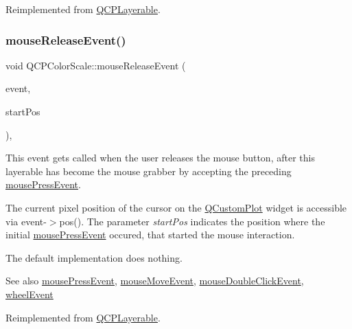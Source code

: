 Reimplemented from \hyperlink{class_q_c_p_layerable_af6567604818db90f4fd52822f8bc8376}{Q\+C\+P\+Layerable}.

\mbox{\label{class_q_c_p_color_scale_a6a35dd39ab4e5cb2d7b29ebb4d5b61b0}} 
\subsubsection{\texorpdfstring{mouse\+Release\+Event()}{mouseReleaseEvent()}}
{\footnotesize\ttfamily void Q\+C\+P\+Color\+Scale\+::mouse\+Release\+Event (\begin{DoxyParamCaption}\item[{Q\+Mouse\+Event $\ast$}]{event,  }\item[{const Q\+PointF \&}]{start\+Pos }\end{DoxyParamCaption})\hspace{0.3cm}{\ttfamily [protected]}, {\ttfamily [virtual]}}

This event gets called when the user releases the mouse button, after this layerable has become the mouse grabber by accepting the preceding \hyperlink{class_q_c_p_color_scale_a91f633b97ffcd57fdf8cd814974c20e6}{mouse\+Press\+Event}.

The current pixel position of the cursor on the \hyperlink{class_q_custom_plot}{Q\+Custom\+Plot} widget is accessible via {\ttfamily event-\/$>$pos()}. The parameter {\itshape start\+Pos} indicates the position where the initial \hyperlink{class_q_c_p_color_scale_a91f633b97ffcd57fdf8cd814974c20e6}{mouse\+Press\+Event} occured, that started the mouse interaction.

The default implementation does nothing.

\begin{DoxySeeAlso}{See also}
\hyperlink{class_q_c_p_color_scale_a91f633b97ffcd57fdf8cd814974c20e6}{mouse\+Press\+Event}, \hyperlink{class_q_c_p_color_scale_a3b2bd79725aefaf2630fc76e90939442}{mouse\+Move\+Event}, \hyperlink{class_q_c_p_layerable_a4171e2e823aca242dd0279f00ed2de81}{mouse\+Double\+Click\+Event}, \hyperlink{class_q_c_p_color_scale_a63cf19be184f6670c9495ad3a9a1baeb}{wheel\+Event} 
\end{DoxySeeAlso}


Reimplemented from \hyperlink{class_q_c_p_layerable_aa0d79b005686f668622bbe66ac03ba2c}{Q\+C\+P\+Layerable}.

